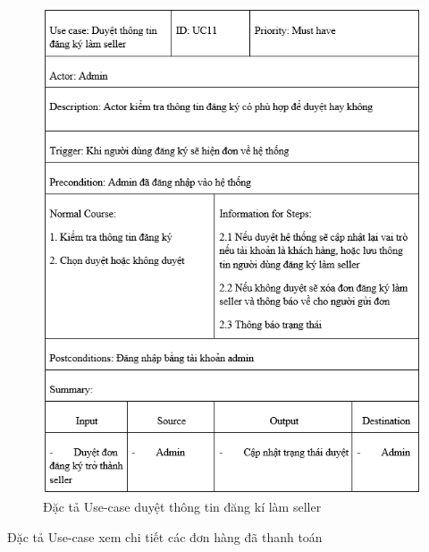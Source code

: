\documentclass{article}
\begin{document}
{{{{{{{{{{{	\begin{center}
		\begin{figure}[htp]
			\begin{center}
				\includegraphics[scale=.900]{anh21.png}
			\end{center}
			\caption{Đặc tả Use-case duyệt thông tin đăng kí làm seller}
			
		\end{figure}
	\end{center}
\newpage
{\large Đặc tả Use-case xem chi tiết các đơn hàng đã thanh toán
	
}}}}}}}}}}}}
\end{document}
